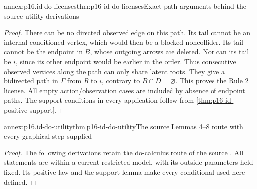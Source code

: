 \begin{annexitem}{annex:p16.id-do-licenses}{thm:p16-id-do-licenses}{Exact path arguments behind the source utility derivations}
\begin{proof}
There can be no directed observed edge on this path. Its tail
cannot be an internal conditioned vertex, which would then be
a blocked noncollider. Its tail cannot be the endpoint in \(B\),
whose outgoing arrows are deleted. Nor can its tail be \(i\),
since its other endpoint would be earlier in the order. Thus
consecutive observed vertices along the path can only share
latent roots. They give a bidirected path in \(\Gamma\) from
\(B\) to \(i\), contrary to \(B\cap D=\varnothing\).
This proves the Rule 2 license. All empty action/observation cases
are included by absence of endpoint paths. The support conditions
in every application follow from \cref{thm:p16-id-positive-support}.
\end{proof}
\end{annexitem}

\begin{annexitem}{annex:p16.id-do-utility}{thm:p16-id-do-utility}{The source Lemmas 4--8 route with every graphical step supplied}
\begin{proof}
The following derivations retain the do-calculus route of the source
\cite[Lemmas~4--8, p.~1224]{ShpitserPearl2006JointIdentification}.
All statements are within a current restricted model, with its
outside parameters held fixed. Its positive law and the support
lemma make every conditional used here defined.


\end{proof}
\end{annexitem}
